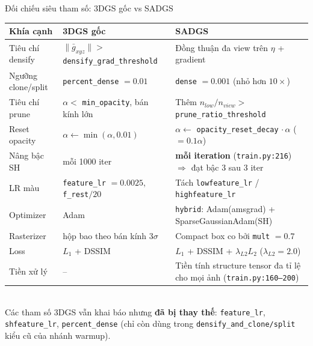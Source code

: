 \begin{frame}{Đối chiếu siêu tham số: 3DGS gốc vs SADGS}
\scriptsize
\centering
\begin{tabular}{lll}
\toprule
\textbf{Khía cạnh} & \textbf{3DGS gốc} & \textbf{SADGS} \\
\midrule
Tiêu chí densify & $\lVert \bar g_{xyz}\rVert > $ \texttt{densify\_grad\_threshold} & Đồng thuận đa view trên $\eta$ + gradient \\
Ngưỡng clone/split & \texttt{percent\_dense} $=0.01$ & \texttt{dense} $=0.001$ (nhỏ hơn $10\times$) \\
Tiêu chí prune & $\alpha <$ \texttt{min\_opacity}, bán kính lớn & Thêm $n_{low}/n_{view} >$ \texttt{prune\_ratio\_threshold} \\
Reset opacity & $\alpha \leftarrow \min(\alpha, 0.01)$ & $\alpha \leftarrow$ \texttt{opacity\_reset\_decay} $\cdot\,\alpha$ ($=0.1\alpha$) \\
Nâng bậc SH & mỗi 1000 iter & \textbf{mỗi iteration} (\texttt{train.py:216}) $\Rightarrow$ đạt bậc 3 sau 3 iter \\
LR màu & \texttt{feature\_lr} $=0.0025$, \texttt{f\_rest}$/20$ & Tách \texttt{lowfeature\_lr} / \texttt{highfeature\_lr} \\
Optimizer & Adam & \texttt{hybrid}: Adam(amsgrad) + SparseGaussianAdam(SH) \\
Rasterizer & hộp bao theo bán kính $3\sigma$ & Compact box co bởi \texttt{mult} $=0.7$ \\
Loss & $L_1$ + DSSIM & $L_1$ + DSSIM + $\lambda_{L2}L_2$ ($\lambda_{L2}=2.0$) \\
Tiền xử lý & -- & Tiền tính structure tensor đa tỉ lệ cho mọi ảnh (\texttt{train.py:160--200}) \\
\bottomrule
\end{tabular}
\vspace{0.2cm}\\
\footnotesize
Các tham số 3DGS vẫn khai báo nhưng \textbf{đã bị thay thế}: \texttt{feature\_lr}, \texttt{shfeature\_lr}, \texttt{percent\_dense} (chỉ còn dùng trong \texttt{densify\_and\_clone/split} kiểu cũ của nhánh warmup).
\end{frame}

